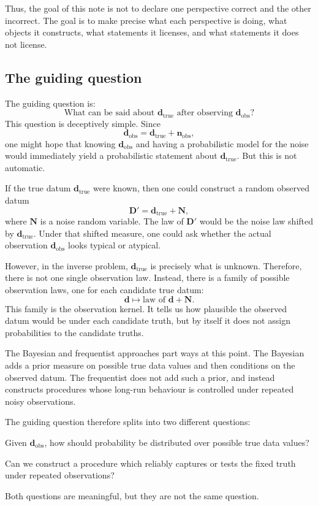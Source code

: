 \documentclass[11pt]{article}
\newcommand{\Dobsrand}{\mathbf D'}
\newcommand{\Nrand}{\mathbf N}
\newcommand{\dtrue}{\mathbf d_{\mathrm{true}}}
\newcommand{\dobs}{\mathbf d_{\mathrm{obs}}}
\newcommand{\nobs}{\mathbf n_{\mathrm{obs}}}
\begin{document}
Thus, the goal of this note is not to declare one perspective correct and the other incorrect. The goal is to make precise what each perspective is doing, what objects it constructs, what statements it licenses, and what statements it does not license.

\subsection{The guiding question}

The guiding question is:
\[
    \text{What can be said about } \dtrue
    \text{ after observing } \dobs?
\]
This question is deceptively simple. Since
\[
    \dobs=\dtrue+\nobs,
\]
one might hope that knowing \(\dobs\) and having a probabilistic model for the noise would immediately yield a probabilistic statement about \(\dtrue\). But this is not automatic.

If the true datum \(\dtrue\) were known, then one could construct a random observed datum
\[
    \Dobsrand=\dtrue+\Nrand,
\]
where \(\Nrand\) is a noise random variable. The law of \(\Dobsrand\) would be the noise law shifted by \(\dtrue\). Under that shifted measure, one could ask whether the actual observation \(\dobs\) looks typical or atypical.

However, in the inverse problem, \(\dtrue\) is precisely what is unknown. Therefore, there is not one single observation law. Instead, there is a family of possible observation laws, one for each candidate true datum:
\[
    \mathbf d
    \longmapsto
    \text{law of } \mathbf d+\Nrand.
\]
This family is the observation kernel. It tells us how plausible the observed datum would be under each candidate truth, but by itself it does not assign probabilities to the candidate truths.

The Bayesian and frequentist approaches part ways at this point. The Bayesian adds a prior measure on possible true data values and then conditions on the observed datum. The frequentist does not add such a prior, and instead constructs procedures whose long-run behaviour is controlled under repeated noisy observations.

The guiding question therefore splits into two different questions:
\begin{description}[leftmargin=2.5cm,style=nextline]
    \item[Bayesian question.]
    Given \(\dobs\), how should probability be distributed over possible true data values?

    \item[Frequentist question.]
    Can we construct a procedure which reliably captures or tests the fixed truth under repeated observations?
\end{description}
Both questions are meaningful, but they are not the same question.
\end{document}
